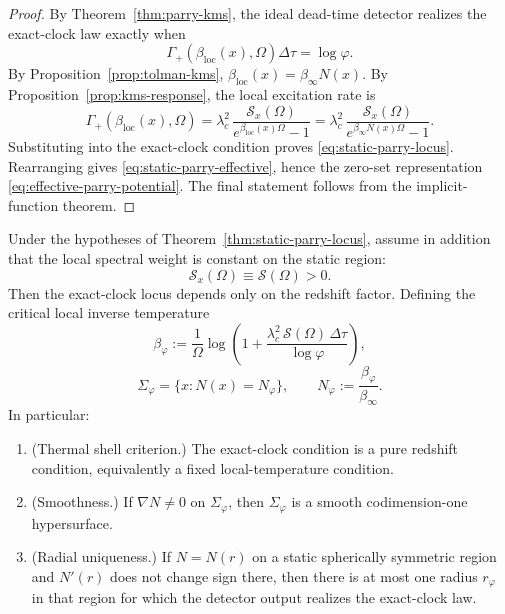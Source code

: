 \begin{proof}
By Theorem~\ref{thm:parry-kms}, the ideal dead-time detector realizes the exact-clock law exactly when
\[
\Gamma_+(\beta_{\mathrm{loc}}(x),\Omega)\Delta\tau=\log\varphi.
\]
By Proposition~\ref{prop:tolman-kms}, $\beta_{\mathrm{loc}}(x)=\beta_\infty N(x)$. By Proposition~\ref{prop:kms-response}, the local excitation rate is
\[
\Gamma_+(\beta_{\mathrm{loc}}(x),\Omega)
=
\lambda_c^2\,
\frac{\mathcal S_x(\Omega)}{e^{\beta_{\mathrm{loc}}(x)\Omega}-1}
=
\lambda_c^2\,
\frac{\mathcal S_x(\Omega)}{e^{\beta_\infty N(x)\Omega}-1}.
\]
Substituting into the exact-clock condition proves \eqref{eq:static-parry-locus}. Rearranging gives \eqref{eq:static-parry-effective}, hence the zero-set representation \eqref{eq:effective-parry-potential}. The final statement follows from the implicit-function theorem.
\end{proof}

\begin{theorem}\label{thm:tolman-parry}
Under the hypotheses of Theorem~\ref{thm:static-parry-locus}, assume in addition that the local spectral weight is constant on the static region:
\[
\mathcal S_x(\Omega)\equiv \mathcal S(\Omega)>0.
\]
Then the exact-clock locus depends only on the redshift factor. Defining the critical local inverse temperature
\begin{equation}\label{eq:beta-parry}
\beta_\varphi
:=
\frac{1}{\Omega}
\log\!\left(
1+\frac{\lambda_c^2\,\mathcal S(\Omega)\,\Delta\tau}{\log\varphi}
\right),
\end{equation}
\begin{equation}\label{eq:parry-redshift-level}
\Sigma_\varphi
=
\{x:N(x)=N_\varphi\},
\qquad
N_\varphi:=\frac{\beta_\varphi}{\beta_\infty}.
\end{equation}
In particular:
\begin{enumerate}[label=\textup{(\roman*)},leftmargin=*,itemsep=4pt]
\item \textup{(Thermal shell criterion.)} The exact-clock condition is a pure redshift condition, equivalently a fixed local-temperature condition.
\item \textup{(Smoothness.)} If $\nabla N\neq 0$ on $\Sigma_\varphi$, then $\Sigma_\varphi$ is a smooth codimension-one hypersurface.
\item \textup{(Radial uniqueness.)} If $N=N(r)$ on a static spherically symmetric region and $N'(r)$ does not change sign there, then there is at most one radius $r_\varphi$ in that region for which the detector output realizes the exact-clock law.
\end{enumerate}
\end{theorem}

